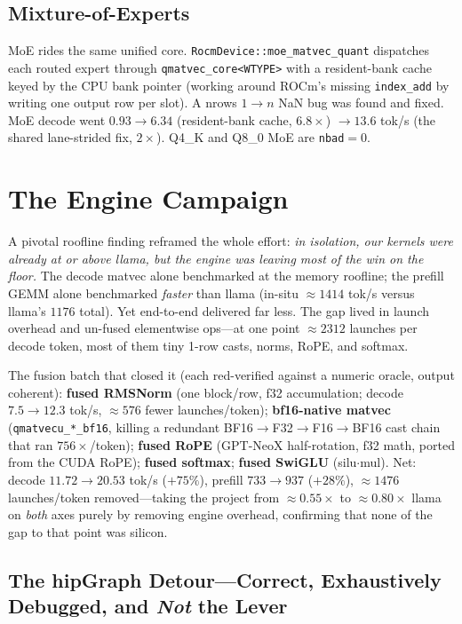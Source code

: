 \documentclass[11pt]{article}
\begin{document}
\subsection{Mixture-of-Experts}

MoE rides the same unified core. \texttt{RocmDevice::moe\_matvec\_quant} dispatches each routed expert through \texttt{qmatvec\_core<WTYPE>} with a resident-bank cache keyed by the CPU bank pointer (working around ROCm's missing \texttt{index\_add} by writing one output row per slot). A nrows $1\to n$ NaN bug was found and fixed. MoE decode went $0.93 \to 6.34$ (resident-bank cache, $6.8\times$) $\to 13.6$ tok/s (the shared lane-strided fix, $2\times$). Q4\_K and Q8\_0 MoE are \texttt{nbad}$=0$.

\section{The Engine Campaign}
\label{sec:engine}

A pivotal roofline finding reframed the whole effort: \emph{in isolation, our kernels were already at or above llama, but the engine was leaving most of the win on the floor.} The decode matvec alone benchmarked at the memory roofline; the prefill GEMM alone benchmarked \emph{faster} than llama (in-situ $\approx 1414$ tok/s versus llama's $1176$ total). Yet end-to-end delivered far less. The gap lived in launch overhead and un-fused elementwise ops---at one point $\approx 2312$ launches per decode token, most of them tiny 1-row casts, norms, RoPE, and softmax.

The fusion batch that closed it (each red-verified against a numeric oracle, output coherent): \textbf{fused RMSNorm} (one block/row, f32 accumulation; decode $7.5 \to 12.3$ tok/s, $\approx 576$ fewer launches/token); \textbf{bf16-native matvec} (\texttt{qmatvecu\_*\_bf16}, killing a redundant BF16$\to$F32$\to$F16$\to$BF16 cast chain that ran $756\times$/token); \textbf{fused RoPE} (GPT-NeoX half-rotation, f32 math, ported from the CUDA RoPE); \textbf{fused softmax}; \textbf{fused SwiGLU} (silu$\cdot$mul). Net: decode $11.72 \to 20.53$ tok/s ($+75\%$), prefill $733 \to 937$ ($+28\%$), $\approx 1476$ launches/token removed---taking the project from $\approx 0.55\times$ to $\approx 0.80\times$ llama on \emph{both} axes purely by removing engine overhead, confirming that none of the gap to that point was silicon.

\subsection{The hipGraph Detour---Correct, Exhaustively Debugged, and \emph{Not} the Lever}
\end{document}
